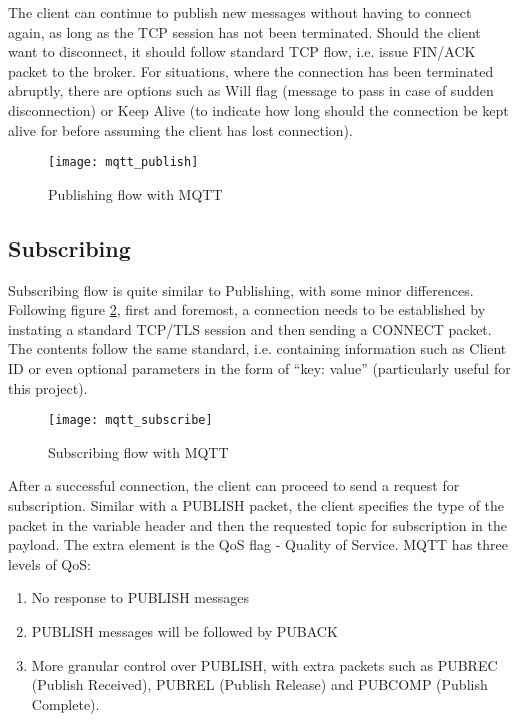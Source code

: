 The client can continue to publish new messages without having to connect again, as long as the TCP session has not been terminated. Should the client want to disconnect, it should follow standard TCP flow, i.e. issue FIN/ACK packet to the broker. For situations, where the connection has been terminated abruptly, there are options such as Will flag (message to pass in case of sudden disconnection) or Keep Alive (to indicate how long should the connection be kept alive for before assuming the client has lost connection).

\begin{figure}[ht]
    \centering
    \texttt{[image: mqtt\_publish]}
    \caption{Publishing flow with MQTT}
    \label{fig:mqtt_publish}
\end{figure}


\subsection{Subscribing}\label{sec:sub}

Subscribing flow is quite similar to Publishing, with some minor differences. Following figure \ref{fig:mqtt_subscribe}, first and foremost, a connection needs to be established by instating a standard TCP/TLS session and then sending a CONNECT packet. The contents follow the same standard, i.e. containing information such as Client ID or even optional parameters in the form of ``key: value'' (particularly useful for this project).

\begin{figure}[ht]
    \centering
    \texttt{[image: mqtt\_subscribe]}
    \caption{Subscribing flow with MQTT}
    \label{fig:mqtt_subscribe}
\end{figure}

After a successful connection, the client can proceed to send a request for subscription. Similar with a PUBLISH packet, the client specifies the type of the packet in the variable header and then the requested topic for subscription in the payload. The extra element is the QoS flag - Quality of Service. MQTT has three levels of QoS:
\begin{enumerate}\addtocounter{enumi}{-1}
  \item No response to PUBLISH messages
  \item PUBLISH messages will be followed by PUBACK
  \item More granular control over PUBLISH, with extra packets such as PUBREC (Publish Received), PUBREL (Publish Release) and PUBCOMP (Publish Complete).
\end{enumerate}

